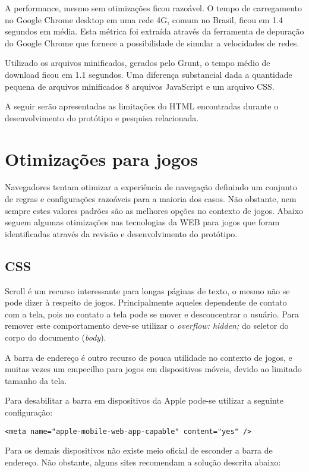 A performance, mesmo sem otimizações ficou razoável. O tempo de
carregamento no Google Chrome desktop em uma rede 4G, comum no Brasil,
ficou em 1.4 segundos em média. Esta métrica foi extraída através da
ferramenta de depuração do Google Chrome que fornece a possibilidade
de simular a velocidades de redes.

Utilizado os arquivos minificados, gerados pelo Grunt, o tempo médio
de download ficou em 1.1 segundos. Uma diferença substancial dada a
quantidade pequena de arquivos minificados 8 arquivos JavaScript e um
arquivo CSS.

A seguir serão apresentadas as limitações do HTML encontradas durante
o desenvolvimento do protótipo e pesquisa relacionada.

\section{Otimizações para jogos}
Navegadores tentam otimizar a experiência de navegação definindo
um conjunto de regras e configurações razoáveis para a maioria dos
casos. Não obstante, nem sempre estes valores padrões são as melhores
opções no contexto de jogos. Abaixo seguem algumas otimizações nas tecnologias da WEB para jogos que foram identificadas através da revisão e desenvolvimento do protótipo.

\subsection{CSS}

Scroll é um recurso interessante para longas páginas de texto,
o mesmo não se pode dizer à respeito de jogos.
Principalmente aqueles dependente de contato com a tela, pois
no contato a tela pode se mover e desconcentrar o usuário. Para
remover este comportamento deve-se utilizar o \textit{overflow:
hidden;} do seletor do corpo do documento (\textit{body}).

A barra de endereço é outro recurso de pouca utilidade no contexto de
jogos, e muitas vezes um empecilho para jogos em dispositivos móveis,
devido ao limitado tamanho da tela.

Para desabilitar a barra em dispositivos da Apple pode-se utilizar a
seguinte configuração:

\begin{verbatim}
<meta name="apple-mobile-web-app-capable" content="yes" />
\end{verbatim}

Para os demais dispositivos não existe meio oficial de esconder a barra
de endereço. Não obstante, alguns sites recomendam a solução descrita abaixo:

